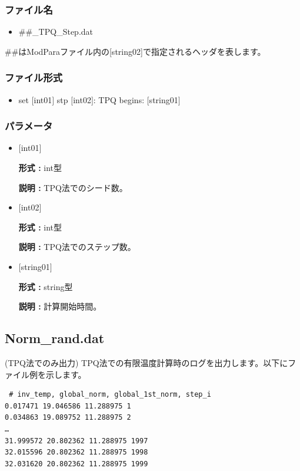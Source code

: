 \subsubsection{ファイル名}
 \begin{itemize}
   \item  \#\#\_TPQ\_Step.dat
  \end{itemize}
  \#\#はModParaファイル内の[string02]で指定されるヘッダを表します。


\subsubsection{ファイル形式}
 \begin{itemize}
   \item set $[$int01$]$ stp $[$int02$]$: TPQ begins: $[$string01$]$
  \end{itemize}
\subsubsection{パラメータ}
 \begin{itemize}

  \item  $[$int01$]$
  
 {\bf 形式 :} int型

{\bf 説明 :} TPQ法でのシード数。
 
  \item  $[$int02$]$
  
 {\bf 形式 :} int型

{\bf 説明 :} TPQ法でのステップ数。

  \item  $[$string01$]$
  
 {\bf 形式 :} string型

{\bf 説明 :} 計算開始時間。

 \end{itemize}

\newpage
\subsection{Norm\_rand.dat}
\label{Subsec:normrand}
(TPQ法でのみ出力) TPQ法での有限温度計算時のログを出力します。以下にファイル例を示します。\\
\begin{minipage}{12.5cm}
\begin{screen}
\begin{verbatim}
 # inv_temp, global_norm, global_1st_norm, step_i 
0.017471 19.046586 11.288975 1
0.034863 19.089752 11.288975 2
…
31.999572 20.802362 11.288975 1997
32.015596 20.802362 11.288975 1998
32.031620 20.802362 11.288975 1999
\end{verbatim}
\end{screen}
\end{minipage}

